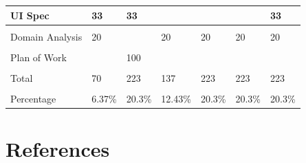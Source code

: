 \documentclass[letterpaper,english, 12pt]{scrreprt}
\begin{document}
\begin{center}
\begin{tabular}{|l|C{2cm}|C{1.5cm}|C{1.5cm}|C{1.5cm}|C{1.5cm}|C{1.5cm}|}
UI Spec                 &      33       &      33       &               &               &               &       33      \\ \hline
                        &               &               &               &               &               &               \\ \hline

Domain Analysis         &      20       &               &       20      &      20       &       20      &       20      \\ \hline
                        &               &               &               &               &               &               \\ \hline

Plan of Work            &               &     100       &               &               &               &               \\ \hline

                        &               &               &               &               &               &               \\ \hline
Total                   &      70       &     223       &      137      &     223       &      223      &      223      \\ \hline
			&		&		&		&		&		&		\\ \hline
Percentage		&	6.37\%	&	20.3\%	&	12.43\%	&	20.3\%	&	20.3\%	&	20.3\%	\\ \hline
	\end{tabular}
\end{center}

\chapter*{References}
\end{document}
